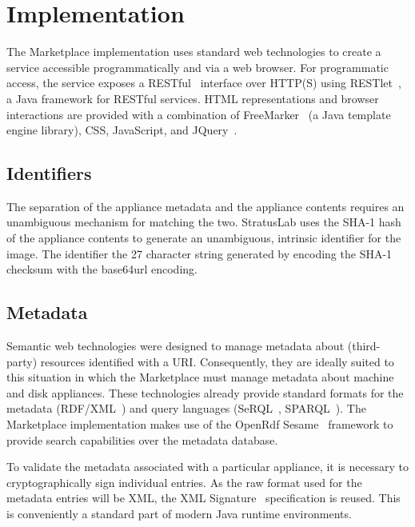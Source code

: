 \section{Implementation}
\label{sec:implementation}

The Marketplace implementation uses standard web technologies to
create a service accessible programmatically and via a web browser.
For programmatic access, the service exposes a RESTful~\cite{rest}
interface over HTTP(S) using RESTlet~\cite{restlet}, a Java framework
for RESTful services.  HTML representations and browser interactions
are provided with a combination of FreeMarker~\cite{freemarker} (a
Java template engine library), CSS, JavaScript, and
JQuery~\cite{jquery}.

\subsection{Identifiers}

The separation of the appliance metadata and the appliance contents
requires an unambiguous mechanism for matching the two.  StratusLab
uses the SHA-1 hash of the appliance contents to generate an
unambiguous, intrinsic identifier for the image.  The identifier the
27 character string generated by encoding the SHA-1 checksum with the
base64url encoding.

\subsection{Metadata}

Semantic web technologies were designed to manage metadata about
(third-party) resources identified with a URI.  Consequently, they are
ideally suited to this situation in which the Marketplace must manage
metadata about machine and disk appliances.  These technologies already
provide standard formats for the metadata (RDF/XML~\cite{rdfxml,
  rdfprimer, rdfschema}) and query languages (SeRQL~\cite{serql},
SPARQL~\cite{sparql}).  The Marketplace implementation makes use of the
OpenRdf Sesame~\cite{sesame} framework to provide search
capabilities over the metadata database.

To validate the metadata associated with a particular appliance, it is
necessary to cryptographically sign individual entries.  As the raw
format used for the metadata entries will be XML, the XML
Signature~\cite{xmlsig} specification is reused.  This is
conveniently a standard part of modern Java runtime environments.

